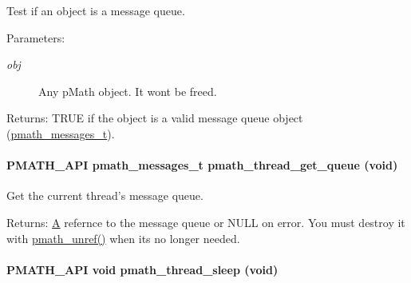 Test if an object is a message queue. 

\begin{Desc}
\item[Parameters:]
\begin{description}
\item[{\em obj}]Any pMath object. It wont be freed. \end{description}
\end{Desc}
\begin{Desc}
\item[Returns:]TRUE if the object is a valid message queue object (\hyperlink{classpmath__messages__t}{pmath\_\-messages\_\-t}). \end{Desc}
\hypertarget{group__threadmsg_gf4d69db0ffe06846e57df7cadcd3dab6}{
\paragraph[{pmath\_\-thread\_\-get\_\-queue}]{\setlength{\rightskip}{0pt plus 5cm}PMATH\_\-API {\bf pmath\_\-messages\_\-t} pmath\_\-thread\_\-get\_\-queue (void)}\hfill}
\label{group__threadmsg_gf4d69db0ffe06846e57df7cadcd3dab6}


Get the current thread's message queue. 

\begin{Desc}
\item[Returns:]\hyperlink{class_a}{A} refernce to the message queue or NULL on error. You must destroy it with \hyperlink{classpmath__t_54e905402c38940687033b87eb8c6c9f}{pmath\_\-unref()} when its no longer needed. \end{Desc}
\hypertarget{group__threadmsg_gce6da6e34b0aeab35094ddccdd9a3e55}{
\paragraph[{pmath\_\-thread\_\-sleep}]{\setlength{\rightskip}{0pt plus 5cm}PMATH\_\-API void pmath\_\-thread\_\-sleep (void)}\hfill}
\label{group__threadmsg_gce6da6e34b0aeab35094ddccdd9a3e55}


